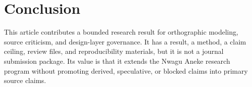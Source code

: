 \documentclass[sigconf,nonacm]{acmart}
\begin{document}
\section{Conclusion}
This article contributes a bounded research result for orthographic modeling,
source criticism, and design-layer governance. It has a result, a method, a
claim ceiling, review files, and reproducibility materials, but it is not a
journal submission package. Its value is that it extends the Nwagu Aneke
research program without promoting derived, speculative, or blocked claims into
primary source claims.



\end{document}
